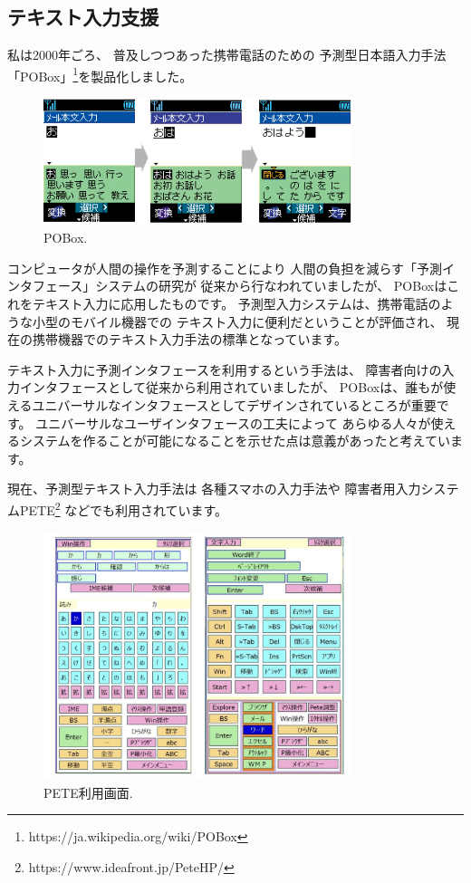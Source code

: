 \documentclass[topics]{compsoft} %
\begin{document}
\subsection{テキスト入力支援}

私は2000年ごろ、
普及しつつあった携帯電話のための
予測型日本語入力手法「POBox」\footnote{
  \textsf{https:{\slash}{\slash}ja.wikipedia.org{\slash}wiki{\slash}POBox}
}を製品化しました。

\begin{figure}[h]
  \includegraphics[width=9cm,bb=0 0 404 600]{figures/ac2b347a7042f920edd576ee07c4b7f4.png}
  \caption{POBox.}
  \label{example1}
\end{figure}

コンピュータが人間の操作を予測することにより
人間の負担を減らす「予測インタフェース」システムの研究が
従来から行なわれていましたが\cite{WatchWhatIDo}\cite{YourWish}、
POBoxはこれをテキスト入力に応用したものです。
%
予測型入力システムは、携帯電話のような小型のモバイル機器での
テキスト入力に便利だということが評価され、
現在の携帯機器でのテキスト入力手法の標準となっています。

テキスト入力に予測インタフェースを利用するという手法は、
障害者向けの入力インタフェースとして従来から利用されていましたが、
POBoxは、誰もが使えるユニバーサルなインタフェースとしてデザインされているところが重要です。
ユニバーサルなユーザインタフェースの工夫によって
あらゆる人々が使えるシステムを作ることが可能になることを示せた点は意義があったと考えています。

現在、予測型テキスト入力手法は
各種スマホの入力手法や
障害者用入力システムPETE\footnote{
  \textsf{https:{\slash}{\slash}www.ideafront.jp{\slash}PeteHP{\slash}}
}
などでも利用されています。

\begin{figure}[h]
  \includegraphics[width=9cm,bb=0 0 1456 1172]{figures/a2f652e2f488b96974e92f8198f49469.jpg}
  \caption{PETE利用画面.}
  \label{pete}
\end{figure}
\end{document}
